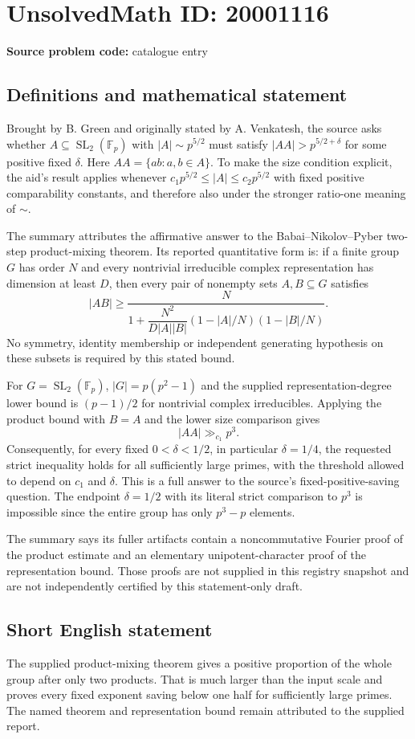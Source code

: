 \documentclass[11pt]{article}
\newcommand{\F}{\mathbb{F}}
\begin{document}
\section*{UnsolvedMath ID: 20001116}
\textbf{Source problem code:} catalogue entry
\subsection{Definitions and mathematical statement}
Brought by B. Green and originally stated by A. Venkatesh, the source asks whether $A\subseteq\operatorname{SL}_2(\F_p)$ with $|A|\sim p^{5/2}$ must satisfy $|AA|>p^{5/2+\delta}$ for some positive fixed $\delta$. Here $AA=\{ab:a,b\in A\}$. To make the size condition explicit, the aid's result applies whenever $c_1p^{5/2}\leq|A|\leq c_2p^{5/2}$ with fixed positive comparability constants, and therefore also under the stronger ratio-one meaning of $\sim$.

The summary attributes the affirmative answer to the Babai--Nikolov--Pyber two-step product-mixing theorem. Its reported quantitative form is: if a finite group $G$ has order $N$ and every nontrivial irreducible complex representation has dimension at least $D$, then every pair of nonempty sets $A,B\subseteq G$ satisfies
\[
 |AB|\geq\frac{N}{1+\dfrac{N^2}{D|A||B|}
                 (1-|A|/N)(1-|B|/N)}.
\]
No symmetry, identity membership or independent generating hypothesis on these subsets is required by this stated bound.

For $G=\operatorname{SL}_2(\F_p)$, $|G|=p(p^2-1)$ and the supplied representation-degree lower bound is $(p-1)/2$ for nontrivial complex irreducibles. Applying the product bound with $B=A$ and the lower size comparison gives
\[
 |AA|\gg_{c_1}p^3.
\]
Consequently, for every fixed $0<\delta<1/2$, in particular $\delta=1/4$, the requested strict inequality holds for all sufficiently large primes, with the threshold allowed to depend on $c_1$ and $\delta$. This is a full answer to the source's fixed-positive-saving question. The endpoint $\delta=1/2$ with its literal strict comparison to $p^3$ is impossible since the entire group has only $p^3-p$ elements.

The summary says its fuller artifacts contain a noncommutative Fourier proof of the product estimate and an elementary unipotent-character proof of the representation bound. Those proofs are not supplied in this registry snapshot and are not independently certified by this statement-only draft.
\subsection{Short English statement}
The supplied product-mixing theorem gives a positive proportion of the whole group after only two products. That is much larger than the input scale and proves every fixed exponent saving below one half for sufficiently large primes. The named theorem and representation bound remain attributed to the supplied report.
\end{document}
